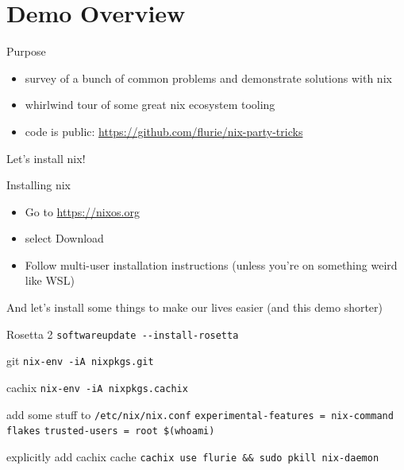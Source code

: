 \documentclass[bigger]{beamer}
\begin{document}
\section{Demo Overview}
\label{sec:org6c22767}
\begin{frame}[label={sec:org7cc5223}]{Purpose}
\begin{itemize}
\item survey of a bunch of common problems and demonstrate solutions with nix
\item whirlwind tour of some great nix ecosystem tooling
\item code is public: \url{https://github.com/flurie/nix-party-tricks}
\end{itemize}
\end{frame}
\begin{frame}[label={sec:org5138c8c}]{Let's install nix!}
\begin{exampleblock}{Installing nix}
\begin{itemize}
\item Go to \url{https://nixos.org}
\item select \alert{Download}
\item Follow multi-user installation instructions (unless you're on something weird like WSL)
\end{itemize}
\end{exampleblock}
\end{frame}
\begin{frame}[label={sec:org92655b2},fragile]{And let's install some things to make our lives easier (and this demo shorter)}
 \begin{exampleblock}{Rosetta 2}
\texttt{softwareupdate -{}-install-rosetta}
\end{exampleblock}
\begin{exampleblock}{git}
\texttt{nix-env -iA nixpkgs.git}
\end{exampleblock}
\begin{exampleblock}{cachix}
\texttt{nix-env -iA nixpkgs.cachix}
\end{exampleblock}
\begin{exampleblock}{add some stuff to \texttt{/etc/nix/nix.conf}}
\texttt{experimental-features = nix-command flakes}
\texttt{trusted-users = root \$(whoami)}
\end{exampleblock}
\begin{exampleblock}{explicitly add cachix cache}
\texttt{cachix use flurie \&\& sudo pkill nix-daemon}
\end{exampleblock}
\end{frame}
\end{document}
